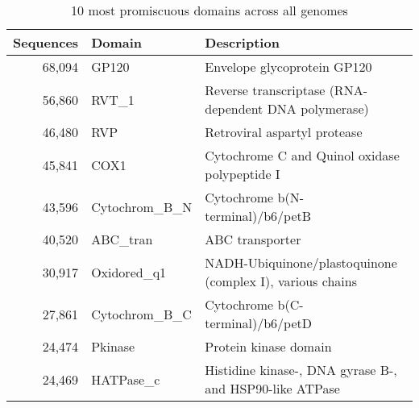 \begin{table}
	\begin{center}
		\sf
		\begin{tabular}{r l l}
			\textbf{Sequences} & \textbf{Domain} & \textbf{Description}	\\
			\hline
			68,094 & GP120 & Envelope glycoprotein GP120                                          \\
			56,860 & RVT\_1 & Reverse transcriptase (RNA-dependent DNA polymerase)                 \\
			46,480 & RVP & Retroviral aspartyl protease                                         \\
			45,841 & COX1 & Cytochrome C and Quinol oxidase polypeptide I                        \\
			43,596 & Cytochrom\_B\_N & Cytochrome b(N-terminal)/b6/petB                                     \\
			40,520 & ABC\_tran & ABC transporter                                                      \\
			30,917 & Oxidored\_q1 & NADH-Ubiquinone/plastoquinone (complex I), various chains            \\
			27,861 & Cytochrom\_B\_C & Cytochrome b(C-terminal)/b6/petD                                     \\
			24,474 & Pkinase & Protein kinase domain                                                \\
			24,469 & HATPase\_c & Histidine kinase-, DNA gyrase B-, and HSP90-like ATPase     \\
			\hline
		\end{tabular}
		\caption{10 most promiscuous domains across all genomes} 
	\end{center}
\end{table}

